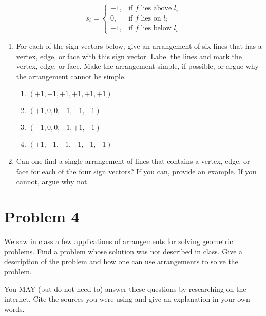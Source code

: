 \documentclass[11pt]{article}
\begin{document}
$$
    s_i =
    \begin{cases}
        +1, & \text{if $f$ lies above $l_i$} \\
        0,  & \text{if $f$ lies on $l_i$} \\
        -1, & \text{if $f$ lies below $l_i$}
    \end{cases}
$$

\begin{enumerate}

    \item For each of the sign vectors below, give an arrangement of six lines
        that has a vertex, edge, or face with this sign vector. Label the lines
        and mark the vertex, edge, or face. Make the arrangement simple, if
        possible, or argue why the arrangement cannot be simple.
        \begin{enumerate}
            \item $(+1, +1, +1, +1, +1, +1)$
            \item $(+1, 0, 0, -1, -1, -1)$
            \item $(-1, 0, 0, -1, +1, -1)$
            \item $(+1, -1, -1, -1, -1, -1)$
        \end{enumerate}

    \item Can one find a single arrangement of lines that contains a vertex,
        edge, or face for each of the four sign vectors? If you can, provide an
        example.  If you cannot, argue why not.

\end{enumerate}

\newpage
\section*{Problem 4}

We saw in class a few applications of arrangements for solving geometric
problems. Find a problem whose solution was not described in class.  Give a
description of the problem and how one can use arrangements to solve the
problem.

You MAY (but do not need to) answer these questions by researching on the
internet. Cite the sources you were using and give an explanation in your own
words.
\end{document}
